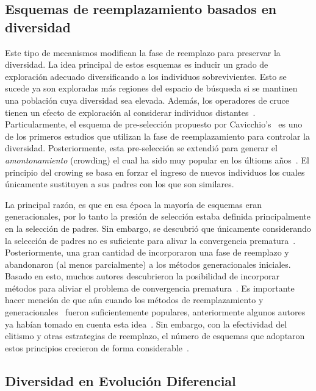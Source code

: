 \subsection{Esquemas de reemplazamiento basados en diversidad}

Este tipo de mecanismos modifican la fase de reemplazo para preservar la diversidad.
%
La idea principal de estos esquemas es inducir un grado de exploración adecuado diversificando a los individuos sobrevivientes.
%
Esto se sucede ya son exploradas más regiones del espacio de búsqueda si se mantinen una población cuya diversidad sea elevada.
%
Además, los operadores de cruce tienen un efecto de exploración al considerar individuos distantes~\cite{eiben1998evolutionary}.
%
Particularmente, el esquema de pre-selección propuesto por Cavicchio's~\cite{grefenstette1986optimization} es uno de los primeros estudios que utilizan la fase de reemplazamiento para controlar la diversidad.
%
Posteriormente, esta pre-selección se extendió para generar el \textit{amontonamiento} (crowding) \cite{de1975analysis} el cual ha sido muy popular en los últioms años~\cite{mahfoud1992crowding, mengshoel2014adaptive}.
%
El principio del crowing se basa en forzar el ingreso de nuevos individuos los cuales únicamente sustituyen a sus padres con los que son similares.

La principal razón, es que en esa época la mayoría de esquemas eran generacionales, por lo tanto la presión de selección estaba definida principalmente en la selección de padres.
%
Sin embargo, se descubrió que únicamente considerando la selección de padres no es suficiente para alivar la convergencia prematura~\cite{blickle1996comparison}.
%
Posteriormente, una gran cantidad de \EAS{} incorporaron una fase de reemplazo y abandonaron (al menos parcialmente) a los métodos generacionales iniciales.
%
Basado en esto, muchos autores descubrieron la posibilidad de incorporar métodos para aliviar el problema de convergencia prematura~\cite{Crepinsek:13}.
%
Es importante hacer mención de que aún cuando los métodos de reemplazamiento y generacionales~\cite{de2006evolutionary} fueron suficientemente populares, anteriormente algunos autores ya habían tomado en cuenta esta idea~\cite{mahfoud1992crowding}.
%
Sin embargo, con la efectividad del elitismo y otras estrategias de reemplazo, el número de esquemas que adoptaron estos principios crecieron de forma considerable~\cite{lozano2008replacement}.
%
\subsection{Diversidad en Evolución Diferencial}

